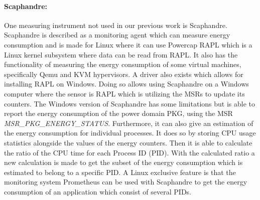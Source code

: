 \paragraph{Scaphandre:}
One measuring instrument not used in our previous work is Scaphandre\cite{scaphandre}. Scaphandre is described as a monitoring agent which can measure energy consumption and is made for Linux where it can use Powercap RAPL which is a Linux kernel subsystem where data can be read from RAPL. It also has the functionality of measuring the energy consumption of some virtual machines, specifically Qemu and KVM hypervisors. A driver also exists which allows for installing RAPL on Windows.\cite{RAPL_Windows} Doing so allows using Scaphandre on a Windows computer where the sensor is RAPL which is utilizing the MSRs to update its counters. The Windows version of Scaphandre has some limitations but is able to report the energy consumption of the power domain PKG, using the MSR \textit{MSR\_PKG\_ENERGY\_STATUS}. Furthermore, it can also give an estimation of the energy consumption for individual processes. It does so by storing CPU usage statistics alongside the values of the energy counters. Then it is able to calculate the ratio of the CPU time for each Process ID (PID). With the calculated ratio a new calculation is made to get the subset of the energy consumption which is estimated to belong to a specific PID. A Linux exclusive feature is that the monitoring system Prometheus can be used with Scaphandre to get the energy consumption of an application which consist of several PIDs.
